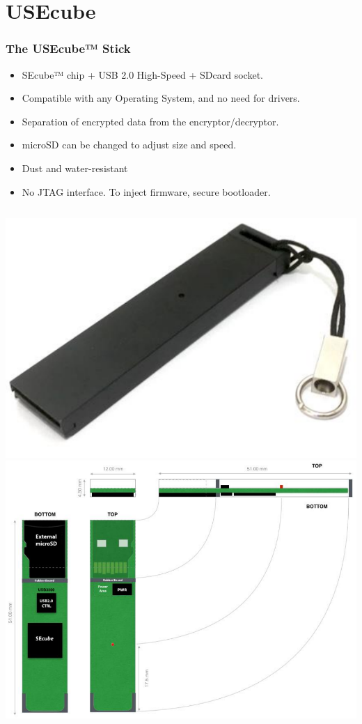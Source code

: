 \documentclass[14pt,usenames,dvipsnames]{beamer}
\begin{document}
\section*{USEcube}

\begin{frame}
	\frametitle{The USEcube™ Stick}
  \begin{itemize}
      \setlength\itemsep{-1pt}  
		  \fontsize{12pt}{14}\selectfont
				
				\item {\color{NavyBlue} SEcube™ chip + USB 2.0 High-Speed + SDcard socket.}
				\item Compatible with any Operating System, and no need for drivers.
				\item Separation of encrypted data from the encryptor/decryptor. 				
				\item microSD can be changed to adjust size and speed.
				\item Dust and water-resistant
				\item No JTAG interface. To inject firmware, secure bootloader.
	  \end{itemize}
	
 	\begin{columns}
      \includegraphics[width=\columnwidth]{usb.png}
      \includegraphics[width=\columnwidth]{usb_sch.png}
   \end{columns}
\end{frame}
\end{document}
